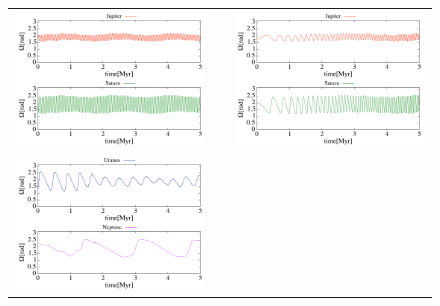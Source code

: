 \documentclass[11pt,a4paper,oneside,onecolumn]{jarticle}
\begin{document}
\begin{figure}[H]
\begin{tabular}{ccc}
\begin{minipage}[t]{0.45\hsize}
\centering
\includegraphics[width=8cm]{./image/NoMove_capitalOMEGA_5Myr_JUPSAT.pdf}
\end{minipage} &
\begin{minipage}[t]{0.1\hsize}
\end{minipage} &
\begin{minipage}[t]{0.45\hsize}
\centering
\includegraphics[width=8cm]{./image/Move500kyr_capitalOMEGA_5Myr_JUPSAT.pdf}
\end{minipage}\\
\begin{minipage}[t]{0.45\hsize}
\centering
\includegraphics[width=8cm]{./image/NoMove_capitalOMEGA_5Myr_URANEP.pdf}
\end{minipage} &

\end{tabular}
\end{figure}
\end{document}
